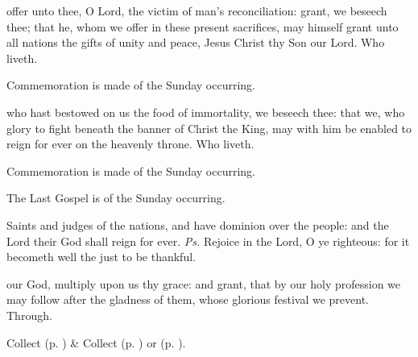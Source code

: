 
\secret
{} offer unto thee, O Lord, the victim of man's reconciliation: grant, we beseech thee; that he, whom we offer in these present sacrifices, may himself grant unto all nations the gifts of unity and peace, Jesus Christ thy Son our Lord. Who liveth.
\begin{rubric}
    Commemoration is made of the Sunday occurring.
\end{rubric}


\postcommunion
{} who hast bestowed on us the food of immortality, we beseech thee: that we, who glory to fight beneath the banner of Christ the King, may with him be enabled to reign for ever on the heavenly throne. Who liveth.
\begin{rubric}
    Commemoration is made of the Sunday occurring.
\end{rubric}
\begin{rubric}
    The Last Gospel is of the Sunday occurring.
\end{rubric}



\introit
{} Saints and judges of the nations, and have dominion over the people: and the Lord their God shall reign for ever. \textit{Ps.} Rejoice in the Lord, O ye righteous: for it becometh well the just to be thankful.

\collect
{} our God, multiply upon us thy grace: and grant, that by our holy profession we may follow after the gladness of them, whose glorious festival we prevent. Through.

\begin{rubric}
	 Collect  (p. \pageref{SPHolyGhost}) \&  Collect  (p. \pageref{SPAgainst}) or  (p. \pageref{SPChiefBishop}).
\end{rubric}

